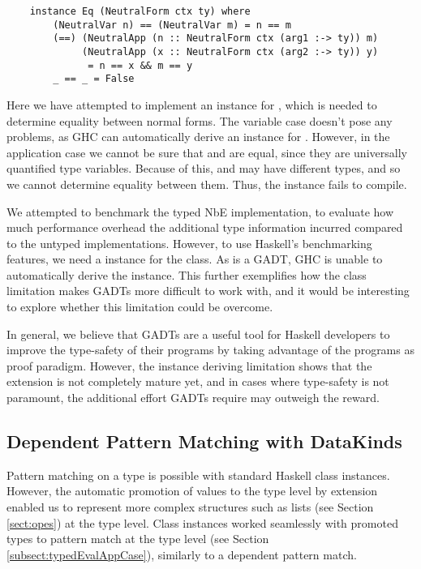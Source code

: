 \begin{lstlisting}
    instance Eq (NeutralForm ctx ty) where
        (NeutralVar n) == (NeutralVar m) = n == m
        (==) (NeutralApp (n :: NeutralForm ctx (arg1 :-> ty)) m) 
             (NeutralApp (x :: NeutralForm ctx (arg2 :-> ty)) y) 
              = n == x && m == y 
        _ == _ = False
\end{lstlisting}

Here we have attempted to implement an  instance for , which is needed to determine equality between normal forms. The variable case doesn't pose any problems, as GHC can automatically derive an  instance for . However, in the application case we cannot be sure that  and  are equal, since they are universally quantified type variables. Because of this,  and  may have different types, and so we cannot determine equality between them. Thus, the instance fails to compile.

We attempted to benchmark the typed NbE implementation, to evaluate how much performance overhead the additional type information incurred compared to the untyped implementations. However, to use Haskell's benchmarking features, we need a  instance for the  class. As  is a GADT, GHC is unable to automatically derive the instance. This further exemplifies how the class limitation makes GADTs more difficult to work with, and it would be interesting to explore whether this limitation could be overcome.

In general, we believe that GADTs are a useful tool for Haskell developers to improve the type-safety of their programs by taking advantage of the programs as proof paradigm. However, the instance deriving limitation shows that the extension is not completely mature yet, and in cases where type-safety is not paramount, the additional effort GADTs require may outweigh the reward. 

\subsection{Dependent Pattern Matching with DataKinds}

Pattern matching on a type is possible with standard Haskell class instances. However, the automatic promotion of values to the type level by  extension enabled us to represent more complex structures such as lists (see Section \ref{sect:opes}) at the type level. Class instances worked seamlessly with  promoted types to pattern match at the type level (see Section \ref{subsect:typedEvalAppCase}), similarly to a dependent pattern match. 

